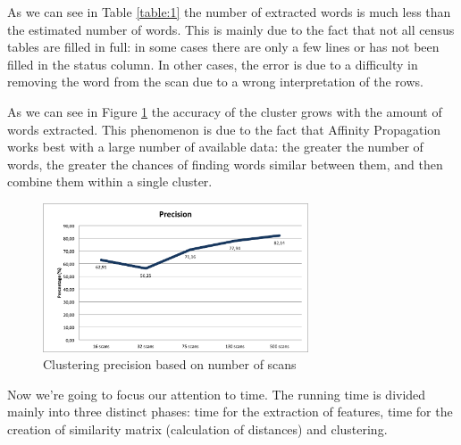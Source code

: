 As we can see in Table \ref{table:1} the number of extracted words is much less than the estimated number of words. This is mainly due to the fact that not all census tables are filled in full: in some cases there are only a few lines or has not been filled in the status column. In other cases, the error is due to a difficulty in removing the word from the scan due to a wrong interpretation of the rows.

As we can see in Figure \ref{fig:precision} the accuracy of the cluster grows with the amount of words extracted. This phenomenon is due to the fact that Affinity Propagation works best with a large number of available data: the greater the number of words, the greater the chances of finding words similar between them, and then combine them within a single cluster.

\begin{figure}[!htbp]
\centering
\includegraphics[width=0.7\textwidth]{images/precisione.png}
\caption{Clustering precision based on number of scans}
\label{fig:precision}
\end{figure}

Now we're going to focus our attention to time. The running time is divided mainly into three distinct phases: time for the extraction of features, time for the creation of similarity matrix (calculation of distances) and clustering.

